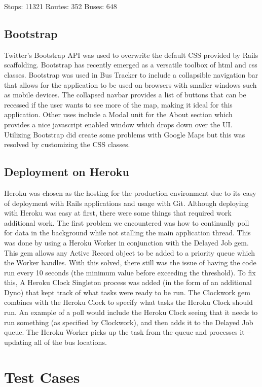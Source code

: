 \documentclass[12pt]{report}
\begin{document}
Stops:  11321
Routes: 352
Buses:  648

\section{Bootstrap}

Twitter's Bootstrap API was used to overwrite the default CSS provided by Rails scaffolding.  Bootstrap has recently emerged as a versatile toolbox of html and css classes.  Bootstrap was used in Bus Tracker to include a collapsible navigation bar that allows for the application to be used on browsers with smaller windows such as mobile devices.  The collapsed navbar provides a list of buttons that can be recessed if the user wants to see more of the map, making it ideal for this application.  Other uses include a Modal unit for the About section which provides a nice javascript enabled window which drops down over the UI.  Utilizing Bootstrap did create some problems with Google Maps but this was resolved by customizing the CSS classes.
\cite{bootstrap}
\section{Deployment on Heroku}

Heroku was chosen as the hosting for the production environment due to its easy of deployment with Rails applications and usage with Git.  Although deploying with Heroku was easy at first, there were some things that required work additional work.  The first problem we encountered was how to continually poll for data in the background while not stalling the main application thread.  This was done by using a Heroku Worker in conjunction with the Delayed Job gem.  This gem allows any Active Record object to be added to a priority queue which the Worker handles.  With this solved, there still was the issue of having the code run every 10 seconds (the minimum value before exceeding the threshold).  To fix this, A Heroku Clock Singleton process was added (in the form of an additional Dyno) that kept track of what tasks were ready to be run.  The Clockwork gem combines with the Heroku Clock to specify what tasks the Heroku Clock should run.  An example of a poll would include the Heroku Clock seeing that it needs to run something (as specified by Clockwork), and then adds it to the Delayed Job queue. The Heroku Worker picks up the task from the queue and processes it -- updating all of the bus locations. \cite{heroku}


\chapter{Test Cases}
\end{document}
